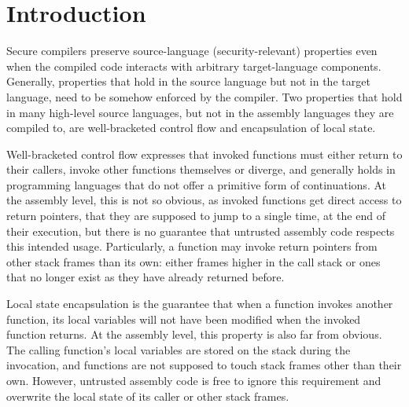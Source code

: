\documentclass[sigplan, review]{acmart}
\begin{document}





\maketitle

\section{Introduction}
Secure compilers preserve source-language (security-relevant) properties even when the compiled code interacts with arbitrary target-language components.
Generally, properties that hold in the source language but not in the target language, need to be somehow enforced by the compiler.
Two properties that hold in many high-level source languages, but not in the assembly languages they are compiled to, are well-bracketed control flow and encapsulation of local state.

Well-bracketed control flow expresses that invoked functions must either return to their callers, invoke other functions themselves or diverge, and generally holds in programming languages that do not offer a primitive form of continuations. 
At the assembly level, this is not so obvious, as invoked functions get direct access to return pointers, that they are supposed to jump to a single time, at the end of their execution, but there is no guarantee that untrusted assembly code respects this intended usage.
Particularly, a function may invoke return pointers from other stack frames than its own: either frames higher in the call stack or ones that no longer exist as they have already returned before. 

Local state encapsulation is the guarantee that when a function invokes another function, its local variables will not have been modified when the invoked function returns.
At the assembly level, this property is also far from obvious.
The calling function's local variables are stored on the stack during the invocation, and functions are not supposed to touch stack frames other than their own.
However, untrusted assembly code is free to ignore this requirement and overwrite the local state of its caller or other stack frames.
\end{document}
